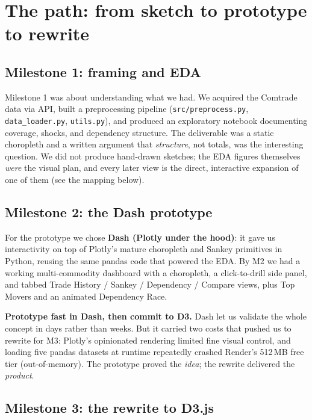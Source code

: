 \documentclass[a4paper,10pt]{article}
\begin{document}
\newpage

\section{The path: from sketch to prototype to rewrite}

\subsection{Milestone 1: framing and EDA}

Milestone 1 was about understanding what we had. We acquired the Comtrade data via
API, built a preprocessing pipeline (\texttt{src/preprocess.py},
\texttt{data\_loader.py}, \texttt{utils.py}), and produced an exploratory notebook
documenting coverage, shocks, and dependency structure. The deliverable was a
static choropleth and a written argument that \emph{structure}, not totals, was
the interesting question. We did not produce hand-drawn sketches; the EDA figures
themselves \emph{were} the visual plan, and every later view is the direct,
interactive expansion of one of them (see the mapping below).

\subsection{Milestone 2: the Dash prototype}

For the prototype we chose \textbf{Dash (Plotly under the hood)}: it gave us
interactivity on top of Plotly's mature choropleth and Sankey primitives in
Python, reusing the same pandas code that powered the EDA. By M2 we had a working
multi-commodity dashboard with a choropleth, a click-to-drill side panel, and
tabbed Trade History / Sankey / Dependency / Compare views, plus Top Movers and an
animated Dependency Race.

\begin{decision}
\textbf{Prototype fast in Dash, then commit to D3.}
Dash let us validate the whole concept in days rather than weeks. But it carried
two costs that pushed us to rewrite for M3: Plotly's opinionated rendering limited
fine visual control, and loading five pandas datasets at runtime repeatedly
crashed Render's 512\,MB free tier (out-of-memory). The prototype proved the
\emph{idea}; the rewrite delivered the \emph{product}.
\end{decision}

\subsection{Milestone 3: the rewrite to D3.js}
\end{document}
